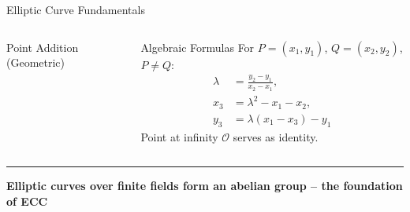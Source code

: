 \documentclass[8pt,aspectratio=169]{beamer}
\newcommand{\bottomnote}[1]{\vfill\vspace{-2mm}\textcolor{mllavender2}{\rule{\textwidth}{0.4pt}}\vspace{1mm}\footnotesize\textbf{#1}}
\begin{document}
\begin{frame}{Elliptic Curve Fundamentals}
\begin{columns}
\begin{block}{Point Addition (Geometric)}
\end{block}
\vspace{1mm}
\begin{block}{Algebraic Formulas}
\small For $P=(x_1,y_1)$, $Q=(x_2,y_2)$, $P \neq Q$:
\begin{align*}
  \lambda &= \frac{y_2 - y_1}{x_2 - x_1}, \\
  x_3 &= \lambda^2 - x_1 - x_2, \\
  y_3 &= \lambda(x_1 - x_3) - y_1
\end{align*}
Point at infinity $\mathcal{O}$ serves as identity.
\end{block}
\end{columns}
\bottomnote{Elliptic curves over finite fields form an abelian group -- the foundation of ECC}
\end{frame}
\end{document}
